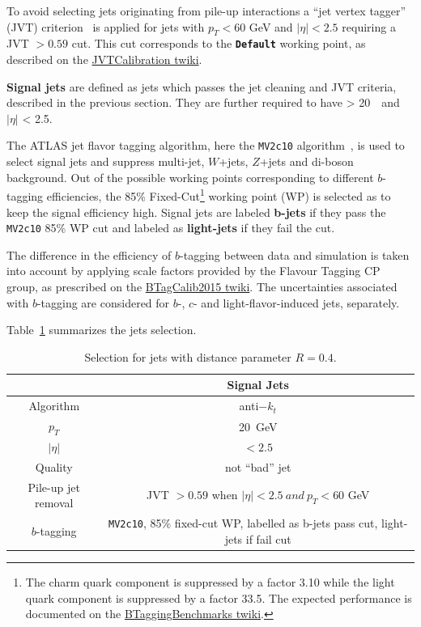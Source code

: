To avoid selecting jets originating from pile-up interactions a ``jet vertex tagger'' (JVT) criterion~\cite{ATLAS-JVTPaper} is applied for jets with $p_T < 60$ GeV and $|\eta|< 2.5$ requiring a JVT $ > 0.59$ cut. This cut corresponds to the \texttt{\textbf{Default}} working point, as described on the \href{https://twiki.cern.ch/twiki/bin/view/AtlasProtected/JVTCalibration}{JVTCalibration twiki}.

\textbf{Signal jets} are defined as jets which passes the jet cleaning and JVT criteria, described in the previous section.
They are further required to have \pt > 20~\GeV ~and $|\eta|$ < 2.5.

\newcommand{\BTagWPFootNote}{The charm quark component is suppressed by a factor 3.10 while the 
light quark component is suppressed by a factor 33.5. The expected performance is documented 
on the \href{https://twiki.cern.ch/twiki/bin/view/AtlasProtected/BTaggingBenchmarks\#MV2c10_tagger_added_on_11th_May}{BTaggingBenchmarks twiki}.}

The ATLAS jet flavor tagging algorithm, here the \texttt{MV2c10} algorithm~\cite{ATL-PHYS-PUB-2016-012}, is used to select signal jets and suppress multi-jet, $W$+jets, $Z$+jets and di-boson background. 
Out of the possible working points corresponding to different $b$-tagging efficiencies, the 85\% Fixed-Cut\footnote{\BTagWPFootNote} working point (WP) is selected as to keep the signal efficiency high. Signal jets are labeled \textbf{b-jets} if they pass the \texttt{MV2c10} 85\% WP cut and labeled as \textbf{light-jets} if they fail the cut.

The difference in the efficiency of $b$-tagging between data and simulation 
is taken into account by applying scale factors provided by the Flavour Tagging CP group, 
as prescribed on the \href{https://twiki.cern.ch/twiki/bin/view/AtlasProtected/BTagCalib2015}{BTagCalib2015 twiki}. 
The uncertainties associated with $b$-tagging are considered for $b$-, $c$- and light-flavor-induced jets, separately. 

Table~\ref{tab:sjdefinit} summarizes the jets selection. 

\begin{table}[htbp!]
\centering 
\small
\begin{tabular}{|c||c|}        
 \hline
 & Signal Jets\\
 \hline
 Algorithm            & anti$-k_t$\\
 $p_T$                & 20~GeV\\
 $|\eta|$             & $< 2.5 $\\
 Quality              & not ``bad'' jet\\
 Pile-up jet removal & JVT $> 0.59$ when $|\eta| < 2.5 ~ and ~p_T < 60 $ GeV\\    
 $b$-tagging          &  \texttt{MV2c10}, 85\% fixed-cut WP, labelled as b-jets pass cut, light-jets if fail cut\\ 
\hline                          
\end{tabular}
\caption{Selection for jets with distance parameter $R = 0.4$.}
\label{tab:sjdefinit}
\end{table}

